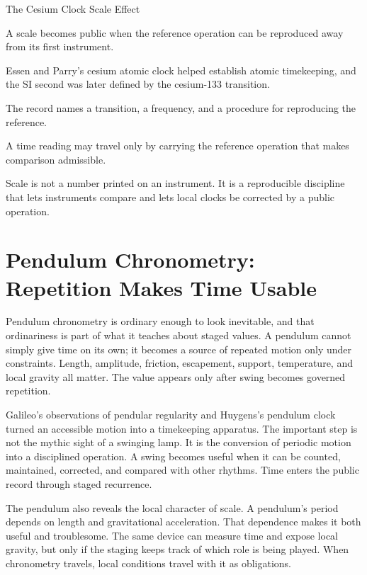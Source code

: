 \begin{phenom}{The Cesium Clock Scale Effect~\cite{essen1955,si1967}}
\label{ph:cesium-clock-scale}

\PhStatement
A scale becomes public when the reference operation can be reproduced away from
its first instrument.

\PhOrigin
Essen and Parry's cesium atomic clock helped establish atomic timekeeping, and
the SI second was later defined by the cesium-133 transition.

\PhObservation
The record names a transition, a frequency, and a procedure for reproducing the
reference.

\PhConstraint
A time reading may travel only by carrying the reference operation that makes
comparison admissible.

\PhConsequence
Scale is not a number printed on an instrument. It is a reproducible discipline
that lets instruments compare and lets local clocks be corrected by a public
operation.
\end{phenom}

\section{Pendulum Chronometry: Repetition Makes Time Usable}

Pendulum chronometry is ordinary enough to look inevitable, and that
ordinariness is part of what it teaches about staged values. A pendulum
cannot simply give time on its own; it becomes a source of repeated motion
only under constraints. Length, amplitude, friction, escapement, support,
temperature, and local gravity all matter. The value appears only after
swing becomes governed repetition.

Galileo's observations of pendular regularity and Huygens's pendulum clock
turned an accessible motion into a timekeeping apparatus. The important step
is not the mythic sight of a swinging lamp. It is the conversion of periodic
motion into a disciplined operation. A swing becomes useful when it can be
counted, maintained, corrected, and compared with other rhythms. Time enters
the public record through staged recurrence.

The pendulum also reveals the local character of scale. A pendulum's period
depends on length and gravitational acceleration. That dependence makes it
both useful and troublesome. The same device can measure time and expose local
gravity, but only if the staging keeps track of which role is being played.
When chronometry travels, local conditions travel with it as obligations.


